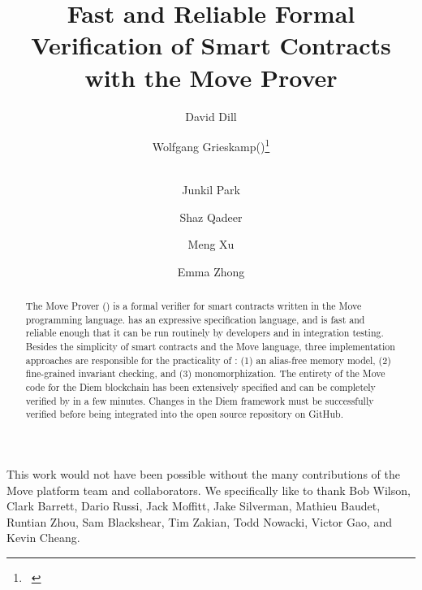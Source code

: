 \documentclass[runningheads,openbib]{llncs}
\begin{document}
\author{
  David Dill \and Wolfgang Grieskamp(\Envelope)\thanks{\mailname~} \and \\ Junkil
  Park \and Shaz Qadeer \and Meng Xu \and Emma Zhong
}


\title{Fast and Reliable Formal Verification of Smart Contracts with the Move Prover}

\maketitle
\begin{abstract}
  The Move Prover (\MVP) is a formal verifier for smart contracts written in the
  Move programming language. \MVP has an expressive specification language, and
  is fast and reliable enough that it can be run routinely by developers and in
  integration testing.  Besides the simplicity of smart contracts and the Move
  language, three implementation approaches are responsible for the practicality
  of \MVP: (1) an alias-free memory model, (2) fine-grained invariant checking,
  and (3) monomorphization.  The entirety of the Move code for the Diem
  blockchain has been extensively specified and can be completely verified by
  \MVP in a few minutes. Changes in the Diem framework must be successfully
  verified before being integrated into the open source repository on GitHub.
\end{abstract}









This work would not have been possible without the many contributions of the
Move platform team and collaborators.  We specifically like to thank Bob Wilson,
Clark Barrett, Dario Russi, Jack Moffitt, Jake Silverman, Mathieu Baudet,
Runtian Zhou, Sam Blackshear, Tim Zakian, Todd Nowacki, Victor Gao, and Kevin
Cheang.

%
%

\newpage


\end{document}
